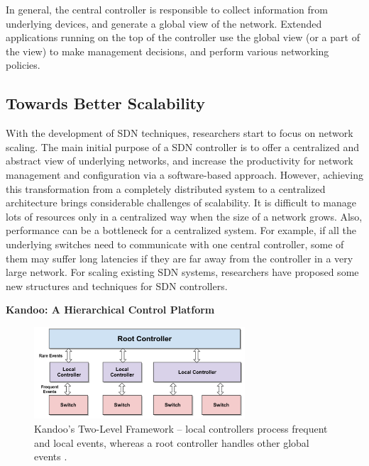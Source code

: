 \documentclass[english]{tktltiki}
\begin{document}
In general, the central controller is responsible to collect information from underlying devices, and generate a global view of the network. Extended applications running on the top of the controller use the global view (or a part of the view) to make management decisions, and perform various networking policies. 

\subsection{Towards Better Scalability}

With the development of SDN techniques, researchers start to focus on network scaling. The main initial purpose of a SDN controller is to offer a centralized and abstract view of underlying networks, and increase the productivity for network management and configuration via a software-based approach. However, achieving this transformation from a completely distributed system to a centralized architecture brings considerable challenges of scalability. It is difficult to manage lots of resources only in a centralized way when the size of a network grows. Also, performance can be a bottleneck for a centralized system. For example, if all the underlying switches need to communicate with one central controller, some of them may suffer long latencies if they are far away from the controller in a very large network. For scaling existing SDN systems, researchers have proposed some new structures and techniques for SDN controllers.

\vspace{1mm}

\textbf{Kandoo: A Hierarchical Control Platform}

\vspace{1mm}

\begin{figure}[htbp]
  \centering
  \includegraphics[width=0.7\textwidth]{images/kandoo.png}
  \caption{Kandoo's Two-Level Framework -- local controllers process frequent and local events, whereas a root controller handles other global events \cite{hyg12}.}
  \label{fig:kandoo}
\end{figure}
\end{document}
